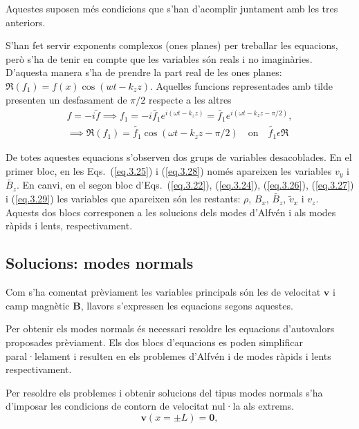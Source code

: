 \documentclass[12pt,a4paper]{article}
\numberwithin{equation}{section}
\begin{document}
Aquestes suposen més condicions que s'han d'acomplir juntament amb les tres anteriors.

S'han fet servir exponents complexos (ones planes) per treballar les equacions,
però s'ha de tenir en compte que les variables són reals i no imaginàries.
D'aquesta manera s'ha de prendre la part real de les ones planes: $\Re(f_1) = f (x) \cos(wt - k_z z)$.
Aquelles funcions representades amb tilde presenten un desfasament de $\pi /2$ respecte a les altres
\begin{align*}
    f = - i \tilde{f} \implies f_1 = - i \tilde{f_1} e^{i(\omega t - k_z z)} = \tilde{f_1} e^{i(\omega t - k_z z - \pi /2)}, \\
    \implies \Re(f_1) = \tilde{f_1} \cos(\omega t - k_z z - \pi / 2) \quad \text{on} \quad \tilde{f_1} \epsilon \Re
\end{align*}

De totes aquestes equacions s'observen dos grups de variables desacoblades.
En el primer bloc, en les Eqs.~(\ref{eq.3.25}) i (\ref{eq.3.28}) només apareixen les variables $v_{y}$ i $\tilde{B_{z}}$.
En canvi, en el segon bloc d'Eqs.~(\ref{eq.3.22}), (\ref{eq.3.24}), (\ref{eq.3.26}), (\ref{eq.3.27}) i (\ref{eq.3.29})
les variables que apareixen són les restants: $\rho$, $B_{x}$, $\tilde{B_{z}}$, $\tilde{v}_{x}$ i $v_{z}$.
Aquests dos blocs corresponen a les solucions dels modes d'Alfvén i als modes ràpids i lents, respectivament.



\subsection{Solucions: modes normals} \label{subsec:modes_normals}
Com s'ha comentat prèviament les variables principals són les de velocitat $\bm{v}$ i camp magnètic $\bm{B}$,
llavors s'expressen les equacions segons aquestes.

Per obtenir els modes normals és necessari resoldre les equacions d'autovalors proposades prèviament.
Els dos blocs d'equacions es poden simplificar paral·lelament i resulten en els problemes d'Alfvén i de modes ràpids i lents respectivament.

Per resoldre els problemes i obtenir solucions del tipus modes normals s'ha d'imposar les condicions de contorn de velocitat nul·la als extrems.
\begin{equation}
    \bm{v} (x = \pm L) = \bm{0}, \tag{3.30} \label{3.30}
\end{equation}
\end{document}
